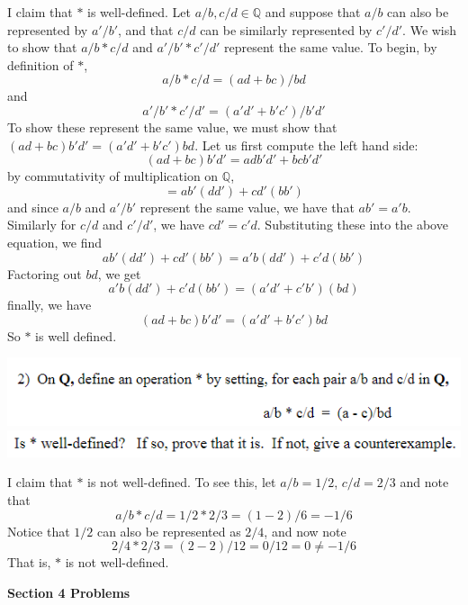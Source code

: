 \documentclass{article}
\begin{document}
I claim that $*$ is well-defined. Let $a/b, c/d \in \mathbb{Q}$ and suppose that $a/b$ can also be represented by $a'/b'$, and that $c/d$ can be similarly represented by $c'/d'$. We wish to show that $a/b * c/d$ and $a'/b' * c'/d'$ represent the same value.
To begin, by definition of $*$,
\[a/b * c/d = (ad + bc)/bd\]
and
\[a'/b' * c'/d' = (a'd' + b'c')/b'd'\]
To show these represent the same value, we must show that $(ad + bc)b'd' = (a'd' + b'c')bd$. Let us first compute the left hand side:
\[(ad + bc)b'd' = adb'd' + bcb'd'\]
by commutativity of multiplication on $\mathbb{Q}$,
\[ = ab'(dd') + cd'(bb')\]
and since $a/b$ and $a'/b'$ represent the same value, we have that $ab' = a'b$. Similarly for $c/d$ and $c'/d'$, we have $cd' = c'd$.
Substituting these into the above equation, we find
\[ab'(dd') + cd'(bb') = a'b(dd') + c'd(bb')\]
Factoring out $bd$, we get
\[a'b(dd') + c'd(bb') = (a'd' + c'b')(bd)\]
finally, we have
\[(ad + bc)b'd' = (a'd' + b'c')bd\]
So $*$ is well defined.


\includegraphics[]{extra problem 2.PNG}
\newline
\includegraphics[]{well defined.PNG}
\newline\newline

I claim that $*$ is not well-defined. To see this, let $a/b = 1/2$, $c/d = 2/3$ and note that
\[a/b * c/d = 1/2 * 2/3 = (1 - 2)/6 = -1/6\]
Notice that $1/2$ can also be represented as $2/4$, and now note
\[2/4 * 2/3 = (2-2)/12 = 0/12 = 0 \neq -1/6\]
That is, $*$ is not well-defined.
\newline\newline

\Large{\textbf{Section 4 Problems}}
\newline
\end{document}
